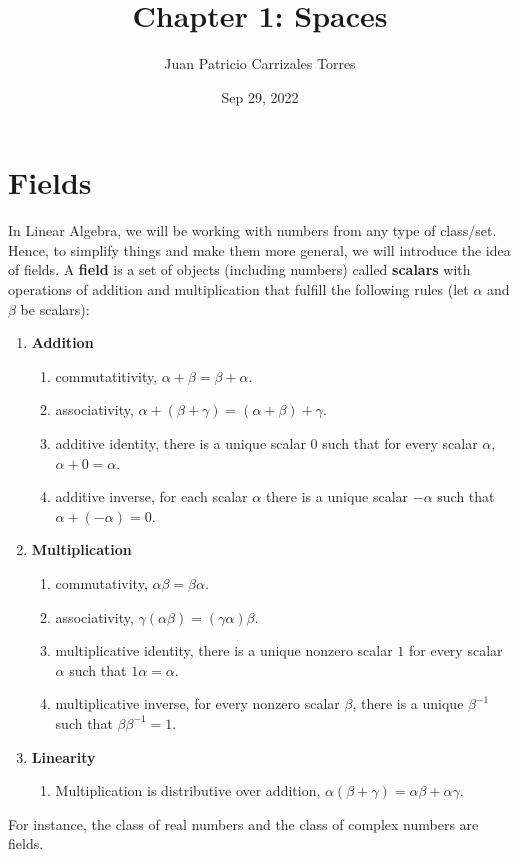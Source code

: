 \documentclass[12pt]{article}
\begin{document}
  
\title{Chapter 1: Spaces}
\author{Juan Patricio Carrizales Torres}
\date{Sep 29, 2022}
\maketitle
\section{Fields}

In Linear Algebra, we will be working with numbers from any type of class/set. Hence, to simplify things and make them more general, we will introduce the idea of fields. A \textbf{field} is a set of objects (including numbers) called \textbf{scalars} with operations of addition and multiplication that fulfill the following rules (let $\alpha$ and $\beta$ be scalars):
\begin{enumerate}
  \item \textbf{Addition}
\begin{enumerate}
  \item commutatitivity, $\alpha+\beta = \beta + \alpha$.
  \item associativity, $\alpha + (\beta + \gamma) = (\alpha + \beta) + \gamma$.
  \item additive identity, there is a unique scalar $0$ such that for every scalar $\alpha$, $\alpha + 0 = \alpha$.
  \item additive inverse, for each scalar $\alpha$ there is a unique scalar $-\alpha$ such that $\alpha + (- \alpha) = 0$.
\end{enumerate}
\item \textbf{Multiplication}
\begin{enumerate}
  \item commutativity, $\alpha\beta = \beta\alpha$.
  \item associativity, $\gamma(\alpha\beta) = (\gamma\alpha)\beta$.
  \item multiplicative identity, there is a unique nonzero scalar $1$ for every scalar $\alpha$ such that $1\alpha = \alpha$.
  \item multiplicative inverse, for every nonzero scalar $\beta$, there is a unique $\beta^{-1}$ such that $\beta\beta^{-1}=1$.
\end{enumerate}
\item \textbf{Linearity}
\begin{enumerate}
  \item Multiplication is distributive over addition, $\alpha(\beta + \gamma) = \alpha\beta + \alpha\gamma$.
\end{enumerate}
\end{enumerate}
For instance, the class of real numbers and the class of complex numbers are fields.
\end{document}
